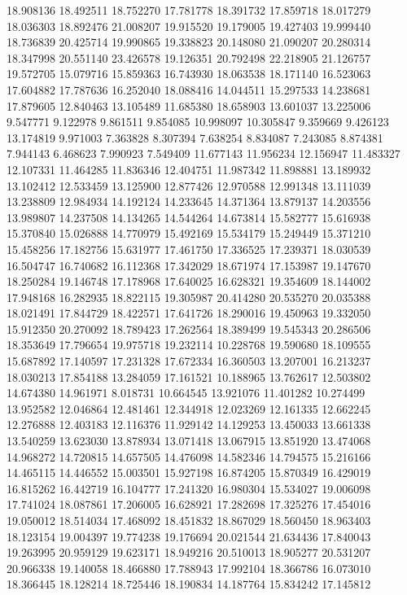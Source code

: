 18.908136
18.492511
18.752270
17.781778
18.391732
17.859718
18.017279
18.036303
18.892476
21.008207
19.915520
19.179005
19.427403
19.999440
18.736839
20.425714
19.990865
19.338823
20.148080
21.090207
20.280314
18.347998
20.551140
23.426578
19.126351
20.792498
22.218905
21.126757
19.572705
15.079716
15.859363
16.743930
18.063538
18.171140
16.523063
17.604882
17.787636
16.252040
18.088416
14.044511
15.297533
14.238681
17.879605
12.840463
13.105489
11.685380
18.658903
13.601037
13.225006
9.547771
9.122978
9.861511
9.854085
10.998097
10.305847
9.359669
9.426123
13.174819
9.971003
7.363828
8.307394
7.638254
8.834087
7.243085
8.874381
7.944143
6.468623
7.990923
7.549409
11.677143
11.956234
12.156947
11.483327
12.107331
11.464285
11.836346
12.404751
11.987342
11.898881
13.189932
13.102412
12.533459
13.125900
12.877426
12.970588
12.991348
13.111039
13.238809
12.984934
14.192124
14.233645
14.371364
13.879137
14.203556
13.989807
14.237508
14.134265
14.544264
14.673814
15.582777
15.616938
15.370840
15.026888
14.770979
15.492169
15.534179
15.249449
15.371210
15.458256
17.182756
15.631977
17.461750
17.336525
17.239371
18.030539
16.504747
16.740682
16.112368
17.342029
18.671974
17.153987
19.147670
18.250284
19.146748
17.178968
17.640025
16.628321
19.354609
18.144002
17.948168
16.282935
18.822115
19.305987
20.414280
20.535270
20.035388
18.021491
17.844729
18.422571
17.641726
18.290016
19.450963
19.332050
15.912350
20.270092
18.789423
17.262564
18.389499
19.545343
20.286506
18.353649
17.796654
19.975718
19.232114
10.228768
19.590680
18.109555
15.687892
17.140597
17.231328
17.672334
16.360503
13.207001
16.213237
18.030213
17.854188
13.284059
17.161521
10.188965
13.762617
12.503802
14.674380
14.961971
8.018731
10.664545
13.921076
11.401282
10.274499
13.952582
12.046864
12.481461
12.344918
12.023269
12.161335
12.662245
12.276888
12.403183
12.116376
11.929142
14.129253
13.450033
13.661338
13.540259
13.623030
13.878934
13.071418
13.067915
13.851920
13.474068
14.968272
14.720815
14.657505
14.476098
14.582346
14.794575
15.216166
14.465115
14.446552
15.003501
15.927198
16.874205
15.870349
16.429019
16.815262
16.442719
16.104777
17.241320
16.980304
15.534027
19.006098
17.741024
18.087861
17.206005
16.628921
17.282698
17.325276
17.454016
19.050012
18.514034
17.468092
18.451832
18.867029
18.560450
18.963403
18.123154
19.004397
19.774238
19.176694
20.021544
21.634436
17.840043
19.263995
20.959129
19.623171
18.949216
20.510013
18.905277
20.531207
20.966338
19.140058
18.466880
17.788943
17.992104
18.366786
16.073010
18.366445
18.128214
18.725446
18.190834
14.187764
15.834242
17.145812
